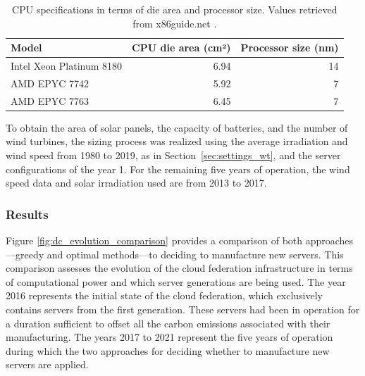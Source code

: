 \begin{table}[h]
  \small
  \caption{CPU specifications in terms of die area and processor size. Values retrieved from x86guide.net \cite{ref_amd_epyc_7742,ref_amd_epyc_7763,ref_xeon_platinum_8180}.} \centering
  \label{tab:cpu_specs} 
  \begin{tabular}{|l|r|r|}
   \hline

  \textbf{Model}  & \textbf{CPU die area (cm²)} & \textbf{Processor size (nm) } \\
    \hline
    Intel Xeon Platinum 8180 & 6.94 & 14\\
    \hline
    AMD EPYC 7742  & 5.92 & 7 \\
   \hline
    AMD EPYC 7763 & 6.45   & 7 \\
  \hline
\end{tabular}  
\end{table}

To obtain the area of solar panels, the capacity of batteries, and the number of wind turbines, the sizing process was realized using the average irradiation and wind speed from 1980 to 2019, as in Section~\ref{sec:settings_wt}, and the server configurations of the year 1. For the remaining five years of operation, the wind speed data and solar irradiation used are from 2013 to 2017.
\subsubsection{Results}

Figure \ref{fig:dc_evolution_comparison} provides a comparison of both approaches---greedy and optimal methods---to deciding to manufacture new servers.   This comparison assesses the evolution of the cloud federation infrastructure in terms of computational power and which server generations are being used. The year 2016 represents the initial state of the cloud federation, which exclusively contains servers from the first generation. These servers had been in operation for a duration sufficient to offset all the carbon emissions associated with their manufacturing. The years 2017 to 2021 represent the five years of operation during which the two approaches for deciding whether to manufacture new servers are applied. 

